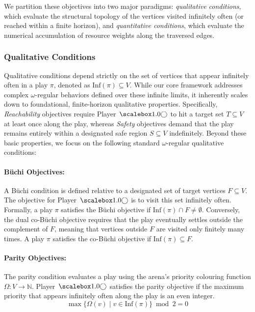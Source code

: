 \documentclass[a4paper,fleqn]{cas-sc}
\begin{document}
We partition these objectives into two major paradigms: \textit{qualitative conditions}, which evaluate the structural topology of the vertices visited infinitely often (or reached within a finite horizon), and \textit{quantitative conditions}, which evaluate the numerical accumulation of resource weights along the traversed edges.

\subsubsection{Qualitative Conditions}
\label{subsec:qualitative}

Qualitative conditions depend strictly on the set of vertices that appear infinitely often in a play $\pi$, denoted as $\text{Inf}(\pi) \subseteq V$. While our core framework addresses complex $\omega$-regular behaviors defined over these infinite limits, it inherently scales down to foundational, finite-horizon qualitative properties. Specifically, \textit{Reachability} objectives require Player~$\even$ to hit a target set $T \subseteq V$ at least once along the play, whereas \textit{Safety} objectives demand that the play remains entirely within a designated safe region $S \subseteq V$ indefinitely. Beyond these basic properties, we focus on the following standard $\omega$-regular qualitative conditions:

\paragraph{Büchi Objectives:}
A Büchi condition is defined relative to a designated set of target vertices $F \subseteq V$. The objective for Player~$\even$ is to visit this set infinitely often. Formally, a play $\pi$ satisfies the Büchi objective if $\text{Inf}(\pi) \cap F \neq \emptyset$.
Conversely, the dual co-Büchi objective requires that the play eventually settles outside the complement of $F$, meaning that vertices outside $F$ are visited only finitely many times. A play $\pi$ satisfies the co-Büchi objective if $\text{Inf}(\pi) \subseteq F$.

\paragraph{Parity Objectives:}
The parity condition evaluates a play using the arena's priority colouring function $\Omega: V \to \mathbb{N}$. Player~$\even$ satisfies the parity objective if the maximum priority that appears infinitely often along the play is an even integer.
\[
\max \{ \Omega(v) \mid v \in \text{Inf}(\pi) \} \bmod 2 = 0 
\]
\end{document}
